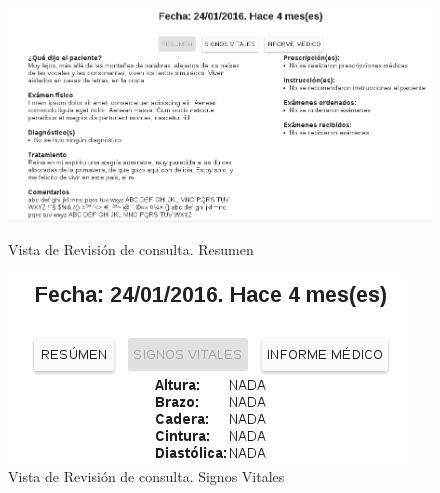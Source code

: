     \begin{figure}[htb!]
        \begin{center}
            \begin{minipage}{0.45\textwidth}
                \begin{center}
                    \includegraphics[width=\linewidth,keepaspectratio=true]{figures/consultarev-resumen}
                \end{center}
                \caption{Vista de Revisión de consulta. Resumen}
                \label{consultarev-resumen}
            \end{minipage}
            \hspace*{\fill}
            \begin{minipage}{0.45\textwidth}
                \begin{center}
                    \includegraphics[width=\linewidth,keepaspectratio=true]{figures/consultarev-signosv}
                \end{center}
                \caption{Vista de Revisión de consulta. Signos Vitales}
                \label{consultarev-signosv}
            \end{minipage}
        \end{center}
    \end{figure}
    
